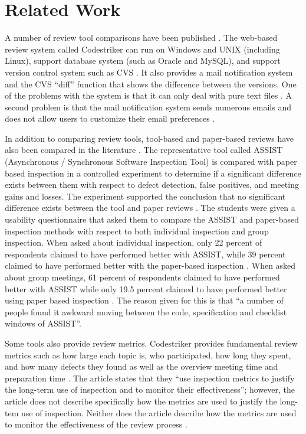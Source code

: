 \chapter{Related Work}
\label{ch:related-work}

A number of review tool comparisons have been published \cite{jason:source}. The web-based review system called Codestriker can run on Windows and UNIX (including Linux), support database system (such as Oracle and MySQL), and support version control system such as CVS \cite{jason:source}. It also provides a mail notification system and the CVS ``diff'' function that shows the difference between the versions. One of the problems with the system is that it can only deal with pure text files \cite{jason:source}.  A second problem is that the mail notification system sends numerous emails and does not allow users to customize their email preferences \cite{jason:source}.

In addition to comparing review tools, tool-based and paper-based reviews have also been compared in the literature \cite{macdonald:comparison}.  The representative tool called ASSIST (Asynchronous / Synchronous Software Inspection Tool) is compared with paper based inspection in a controlled experiment to determine if a significant difference exists between them with respect to defect detection, false positives, and meeting gains and losses. The experiment supported the conclusion that no significant difference exists between the tool and paper reviews \cite{macdonald:comparison}. The students were given a usability questionnaire that asked them to compare the ASSIST and paper-based inspection methods with respect to both individual inspection and group inspection. When asked about individual inspection, only 22 percent of respondents claimed to have performed better with ASSIST, while 39 percent claimed to have performed better with the paper-based inspection \cite{macdonald:comparison}. When asked about group meetings, 61 percent of respondents claimed to have performed better with ASSIST while only 19.5 percent claimed to have performed better using paper based inspection \cite{macdonald:comparison}.  The reason given for this is that ``a number of people found it awkward moving between the code, specification and checklist windows of ASSIST''.

Some tools also provide review metrics. Codestriker provides fundamental review metrics such as how large each topic is, who participated, how long they spent, and how many defects they found as well as the overview meeting time and preparation time \cite{jason:source}. The article states that they ``use inspection metrics to justify the long-term use of inspection and to monitor their effectiveness''; however, the article does not describe specifically how the metrics are used to justify the long-tem use of inspection. Neither does the article describe how the metrics are used to monitor the effectiveness of the review process \cite{jason:source}.

